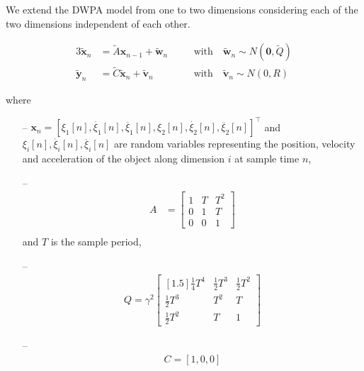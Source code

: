 \documentclass[fleqn]{article}
\begin{document}
We extend the DWPA model from one to two dimensions considering each of the two
dimensions independent of each other.

\begin{alignat*}{3}
    \tilde{\mathbf{x}}_n &= \tilde{A}\mathbf{x}_{n-1} + \tilde{\mathbf{w}}_n && \quad \text{with} \quad\tilde{\mathbf{w}}_n\sim N(\mathbf{0}, \tilde{Q})\\
    \tilde{\mathbf{y}}_n &= \tilde{C}\tilde{\mathbf{x}}_{n} + \tilde{\mathbf{v}}_n && \quad \text{with} \quad \tilde{\mathbf{v}}_n\sim N(0, R)
\end{alignat*}

\noindent where

\begin{itemize}

    \item[--]
        $\mathbf{x}_n=\left[\xi_1[n],\dot{\xi_1}[n],\ddot{\xi_1}[n],\xi_2[n],\dot{\xi_2}[n],\ddot{\xi_2}[n]\right]^\intercal$
        and $\xi_i[n],\dot{\xi_i}[n],\ddot{\xi_i}[n]$ are random variables representing
        the position, velocity and acceleration of the object along dimension
        $i$ at sample time
        $n$,

    \item[--]
        \begin{align*}
            A&=\begin{bmatrix}
                1 & T & T^2\\
                0 & 1 & T\\
                0 & 0 & 1
            \end{bmatrix}\nonumber\\
        \end{align*}
        and $T$ is the sample period,

    \item[--]
        \begin{align*}
            Q=\gamma^2\begin{bmatrix}[1.5]
                \frac{1}{4}T^4&\frac{1}{2}T^3&\frac{1}{2}T^2\\
                \frac{1}{2}T^3&T^2&T\\
                \frac{1}{2}T^2&T&1
            \end{bmatrix}
        \end{align*}

    \item[--]
        \begin{align*}
            C = [1,0,0]
        \end{align*}
\end{itemize}




\end{document}
